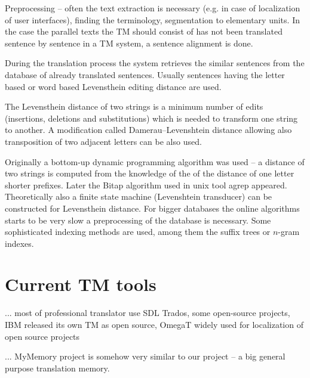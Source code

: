 Preprocessing -- often the text extraction is necessary (e.g. in case of localization of user interfaces), finding the terminology, segmentation to elementary units. In the case the parallel texts the TM should consist of has not been translated sentence by sentence in a TM system, a sentence alignment is done.

During the translation process the system retrieves the similar sentences from the database of already translated sentences. Usually sentences having the letter based or word based Levensthein editing distance are used.

The Levensthein distance of two strings is a minimum number of edits (insertions, deletions and substitutions) which is needed to transform one string to another. A modification called Damerau–Levenshtein distance allowing also transposition of two adjacent letters can be also used.

Originally a bottom-up dynamic programming algorithm was used -- a distance of two strings is computed from the knowledge of the of the distance of one letter shorter prefixes. Later the Bitap algorithm used in unix tool agrep appeared. Theoretically also a finite state machine (Levenshtein transducer) can be constructed for Levensthein distance. For bigger databases the online algorithms starts to be very slow a preprocessing of the database is necessary. Some sophisticated indexing methods are used, among them the suffix trees or $n$-gram indexes.

\section{Current TM tools}

... most of professional translator use SDL Trados, some open-source projects, IBM released its own TM as open source, OmegaT widely used for localization of open source projects

... MyMemory project is somehow very similar to our project -- a big general purpose translation memory. 